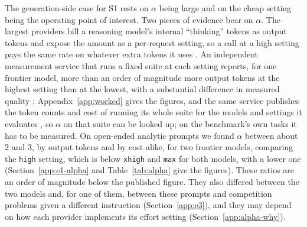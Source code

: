 \documentclass[11pt]{article}
\begin{document}
The generation-side case for S1 rests on $\alpha$ being large and on the cheap setting being the operating point of interest. Two pieces of evidence bear on $\alpha$. The largest providers bill a reasoning model's internal ``thinking'' tokens as output tokens and expose the amount as a per-request setting, so a call at a high setting pays the same rate on whatever extra tokens it uses \citep{openai2026reasoning, anthropic2026thinking}. An independent measurement service that runs a fixed suite at each setting reports, for one frontier model, more than an order of magnitude more output tokens at the highest setting than at the lowest, with a substantial difference in measured quality \citep{aagpt5benchmarks2025}; Appendix~\ref{app:worked} gives the figures, and the same service publishes the token counts and cost of running its whole suite for the models and settings it evaluates \citep{aaintelligence}, so $\alpha$ on that suite can be looked up; on the benchmark's own tasks it has to be measured. On open-ended analytic prompts we found $\alpha$ between about $2$ and $3$, by output tokens and by cost alike, for two frontier models, comparing the \texttt{high} setting, which is below \texttt{xhigh} and \texttt{max} for both models, with a lower one (Section~\ref{app:e1-alpha} and Table~\ref{tab:alpha} give the figures). These ratios are an order of magnitude below the published figure. They also differed between the two models and, for one of them, between these prompts and competition problems given a different instruction (Section~\ref{app:e3}), and they may depend on how each provider implements its effort setting (Section~\ref{app:alpha-why}).
\end{document}
